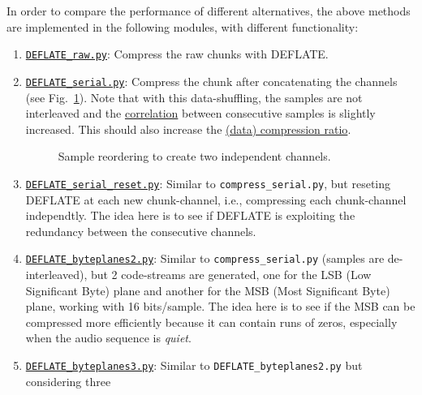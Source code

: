 In order to compare the performance of different alternatives, the
above methods are implemented in the following modules, with different
functionality:

\begin{enumerate}
\item
  \href{https://github.com/Tecnologias-multimedia/InterCom/blob/master/src/DEFLATE\_raw.py}{\texttt{DEFLATE\_raw.py}}:
  Compress the raw chunks with DEFLATE.
\item
  \href{https://github.com/Tecnologias-multimedia/InterCom/blob/master/src/DEFLATE\_serial.py}{\texttt{DEFLATE\_serial.py}}:
  Compress the chunk after concatenating the channels (see
  Fig.~\ref{fig:reordering}). Note that with this data-shuffling,
  the samples are not interleaved and the
  \href{https://en.wikipedia.org/wiki/Correlation}{correlation}
  between consecutive samples is slightly increased. This should also
  increase the
  \href{https://en.wikipedia.org/wiki/Data_compression_ratio}{(data)
    compression ratio}.
\begin{figure}
  \begin{center}
  \end{center}
  \caption{Sample reordering to create two independent channels.}
  \label{fig:reordering}
\end{figure}
\item
  \href{https://github.com/Tecnologias-multimedia/InterCom/blob/master/src/DEFLATE\_serial\_reset.py}{\texttt{DEFLATE\_serial\_reset.py}}:
  Similar to \verb|compress_serial.py|, but reseting DEFLATE at each
  new chunk-channel, i.e., compressing each chunk-channel
  independtly. The idea here is to see if DEFLATE is exploiting the
  redundancy between the consecutive channels.
\item
  \href{https://github.com/Tecnologias-multimedia/InterCom/blob/master/src/DEFLATE\_byteplanes2.py}{\texttt{DEFLATE\_byteplanes2.py}}:
  Similar to \verb|compress_serial.py| (samples are de-interleaved),
  but 2 code-streams are generated, one for the LSB (Low Significant
  Byte) plane and another for the MSB (Most Significant Byte) plane,
  working with 16 bits/sample. The idea here is to see if the MSB can
  be compressed more efficiently because it can contain runs of zeros,
  especially when the audio sequence is \emph{quiet}.
\item
  \href{https://github.com/Tecnologias-multimedia/InterCom/blob/master/src/DEFLATE\_byteplanes3.py}{\texttt{DEFLATE\_byteplanes3.py}}:
  Similar to \verb|DEFLATE_byteplanes2.py| but considering three

\end{enumerate}
